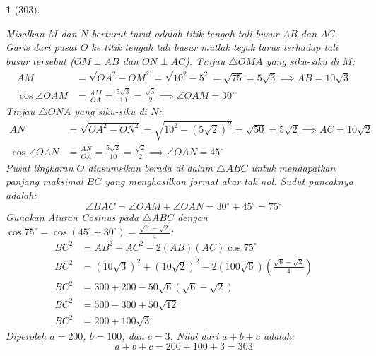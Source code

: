 \documentclass[11pt,a4paper,DIV=12]{scrartcl}
\theoremstyle{problemstyle}
\theoremstyle{answerstyle}
\newtheorem{answer}{}
\begin{document}
\begin{answer}[303]
\begin{center}
  \end{center}
  Misalkan $M$ dan $N$ berturut-turut adalah titik tengah tali busur $AB$ dan $AC$. Garis dari pusat $O$ ke titik tengah tali busur mutlak tegak lurus terhadap tali busur tersebut ($OM \perp AB$ dan $ON \perp AC$).
  Tinjau $\triangle OMA$ yang siku-siku di $M$:
  \begin{align*}
    AM              & = \sqrt{OA^2 - OM^2} = \sqrt{10^2 - 5^2} = \sqrt{75} = 5\sqrt{3} \implies AB = 10\sqrt{3}  \\
    \cos \angle OAM & = \frac{AM}{OA} = \frac{5\sqrt{3}}{10} = \frac{\sqrt{3}}{2} \implies \angle OAM = 30^\circ
  \end{align*}
  Tinjau $\triangle ONA$ yang siku-siku di $N$:
  \begin{align*}
    AN              & = \sqrt{OA^2 - ON^2} = \sqrt{10^2 - (5\sqrt{2})^2} = \sqrt{50} = 5\sqrt{2} \implies AC = 10\sqrt{2} \\
    \cos \angle OAN & = \frac{AN}{OA} = \frac{5\sqrt{2}}{10} = \frac{\sqrt{2}}{2} \implies \angle OAN = 45^\circ
  \end{align*}
  Pusat lingkaran $O$ diasumsikan berada di dalam $\triangle ABC$ untuk mendapatkan panjang maksimal $BC$ yang menghasilkan format akar tak nol. Sudut puncaknya adalah:
  $$ \angle BAC = \angle OAM + \angle OAN = 30^\circ + 45^\circ = 75^\circ $$
  Gunakan Aturan Cosinus pada $\triangle ABC$ dengan $\cos 75^\circ = \cos(45^\circ+30^\circ) = \frac{\sqrt{6}-\sqrt{2}}{4}$:
  \begin{align*}
    BC^2 & = AB^2 + AC^2 - 2(AB)(AC) \cos 75^\circ                                                       \\
    BC^2 & = (10\sqrt{3})^2 + (10\sqrt{2})^2 - 2(100\sqrt{6}) \left( \frac{\sqrt{6}-\sqrt{2}}{4} \right) \\
    BC^2 & = 300 + 200 - 50\sqrt{6} (\sqrt{6}-\sqrt{2})                                                  \\
    BC^2 & = 500 - 300 + 50\sqrt{12}                                                                     \\
    BC^2 & = 200 + 100\sqrt{3}
  \end{align*}
  Diperoleh $a = 200$, $b = 100$, dan $c = 3$. Nilai dari $a+b+c$ adalah:
  $$ a+b+c = 200 + 100 + 3 = \boxed{303} $$
\end{answer}
\end{document}
